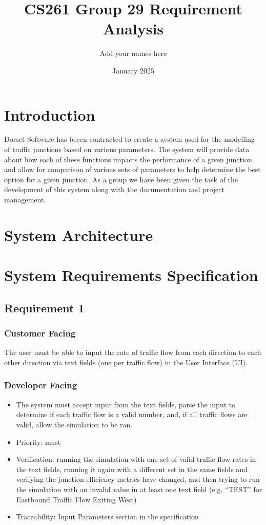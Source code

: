 \documentclass{article}
\title{CS261 Group 29 Requirement Analysis}
\author{Add your names here}
\date{January 2025}
\begin{document}
\maketitle

\section{Introduction}
Dorset Software has beeen contracted to create a system used for the modelling 
of traffic junctions based on various parameters. The system will provide 
data about how each of these functions impacts the performance of a given 
junction and allow for comparison of various sets of parameters to help 
determine the best option for a given junction. As a group we have been given 
the task of the development of this system along with the documentation and 
project management.

\section{System Architecture}

\section{System Requirements Specification}
\subsection{Requirement 1}
\subsubsection{Customer Facing}
The user must be able to input the rate of traffic flow from 
each direction to each other direction via text fields (one per traffic flow) 
in the User Interface (UI).
\subsubsection{Developer Facing}
\begin{itemize}
  \item The system must accept input from the text fields, parse the input to 
  determine if each traffic flow is a valid number, and, if all traffic flows 
  are valid, allow the simulation to be ran.
  \item Priority: must
  \item Verification: running the simulation with one set of valid traffic 
  flow rates in the text fields, running it again with a different set in 
  the same fields and verifying the junction efficiency metrics have changed, 
  and then trying to run the simulation with an invalid value in at least one 
  text field (e.g. “TEST” for Eastbound Traffic Flow Exiting West)
  \item Traceability: Input Parameters section in the specification
\end{itemize}
\end{document}
